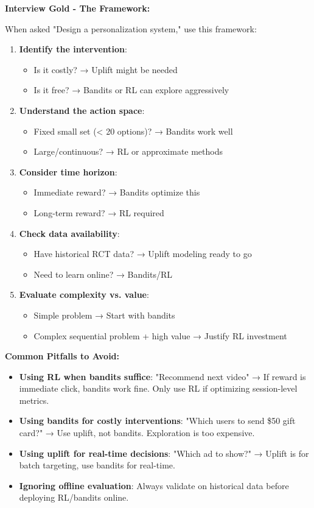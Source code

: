 \documentclass[10pt]{article}
\begin{document}
\textbf{Interview Gold - The Framework:}

When asked "Design a personalization system," use this framework:

\begin{enumerate}
\item \textbf{Identify the intervention}:
\begin{itemize}
\item Is it costly? → Uplift might be needed
\item Is it free? → Bandits or RL can explore aggressively
\end{itemize}

\item \textbf{Understand the action space}:
\begin{itemize}
\item Fixed small set (< 20 options)? → Bandits work well
\item Large/continuous? → RL or approximate methods
\end{itemize}

\item \textbf{Consider time horizon}:
\begin{itemize}
\item Immediate reward? → Bandits optimize this
\item Long-term reward? → RL required
\end{itemize}

\item \textbf{Check data availability}:
\begin{itemize}
\item Have historical RCT data? → Uplift modeling ready to go
\item Need to learn online? → Bandits/RL
\end{itemize}

\item \textbf{Evaluate complexity vs. value}:
\begin{itemize}
\item Simple problem → Start with bandits
\item Complex sequential problem + high value → Justify RL investment
\end{itemize}
\end{enumerate}

\textbf{Common Pitfalls to Avoid:}

\begin{itemize}
\item \textbf{Using RL when bandits suffice}: "Recommend next video" → If reward is immediate click, bandits work fine. Only use RL if optimizing session-level metrics.
\item \textbf{Using bandits for costly interventions}: "Which users to send \$50 gift card?" → Use uplift, not bandits. Exploration is too expensive.
\item \textbf{Using uplift for real-time decisions}: "Which ad to show?" → Uplift is for batch targeting, use bandits for real-time.
\item \textbf{Ignoring offline evaluation}: Always validate on historical data before deploying RL/bandits online.
\end{itemize}
\end{document}
